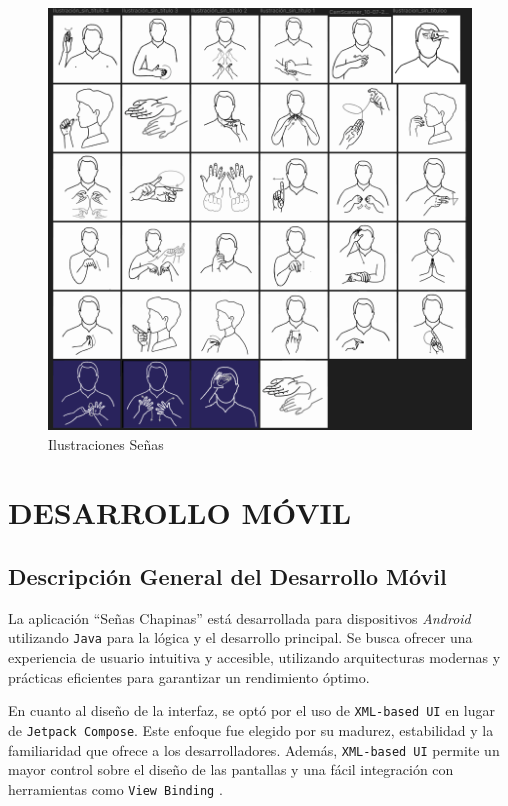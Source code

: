 \begin{figure} [H]
    \centering
    \includegraphics[width=1\linewidth]{figuras/senas.png}
    \caption{Ilustraciones Señas}
    \label{fig:enter-label}
\end{figure}


\section{DESARROLLO MÓVIL}

\subsection{Descripción General del Desarrollo Móvil}

La aplicación ``Señas Chapinas'' está desarrollada para dispositivos \textit{Android} utilizando \texttt{Java} para la lógica y el desarrollo principal. Se busca ofrecer una experiencia de usuario intuitiva y accesible, utilizando arquitecturas modernas y prácticas eficientes para garantizar un rendimiento óptimo.

En cuanto al diseño de la interfaz, se optó por el uso de \texttt{XML-based UI} en lugar de \texttt{Jetpack Compose}. Este enfoque fue elegido por su madurez, estabilidad y la familiaridad que ofrece a los desarrolladores. Además, \texttt{XML-based UI} permite un mayor control sobre el diseño de las pantallas y una fácil integración con herramientas como \texttt{View Binding} \cite{DeLaGrana2024}.

